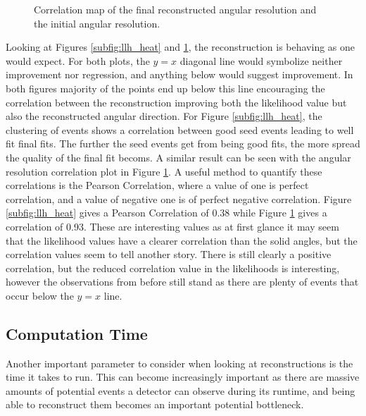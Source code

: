 \begin{figure}[ht]
\begin{minipage}[b]{0.48\linewidth}
    \caption{Correlation map of the final reconstructed angular resolution and the initial angular resolution.}
    \label{subfig:alpha_heat}
  \end{minipage}
\end{figure}

Looking at Figures \ref{subfig:llh_heat} and \ref{subfig:alpha_heat}, the reconstruction is behaving as one would expect. For both plots, the $y=x$ diagonal line would symbolize neither improvement nor regression, and anything below would suggest improvement. In both figures majority of the points end up below this line encouraging the correlation between the reconstruction improving both the likelihood value but also the reconstructed angular direction. For Figure \ref{subfig:llh_heat}, the clustering of events shows a correlation between good seed events leading to well fit final fits. The further the seed events get from being good fits, the more spread the quality of the final fit becoms. A similar result can be seen with the angular resolution correlation plot in Figure \ref{subfig:alpha_heat}. A useful method to quantify these correlations is the Pearson Correlation, where a value of one is perfect correlation, and a value of negative one is of perfect negative correlation. Figure \ref{subfig:llh_heat} gives a Pearson Correlation of 0.38 while Figure \ref{subfig:alpha_heat} gives a correlation of 0.93. These are interesting values as at first glance it may seem that the likelihood values have a clearer correlation than the solid angles, but the correlation values seem to tell another story. There is still clearly a positive correlation, but the reduced correlation value in the likelihoods is interesting, however the observations from before still stand as there are plenty of events that occur below the $y=x$ line. 

\subsection{Computation Time}

Another important parameter to consider when looking at reconstructions is the time it takes to run. This can become increasingly important as there are massive amounts of potential events a detector can observe during its runtime, and being able to reconstruct them becomes an important potential bottleneck. 

